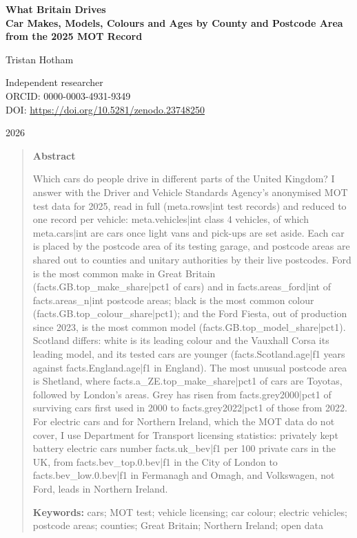 \documentclass[11pt,a4paper]{article}
\begin{document}
\begin{center}
{\Large\bfseries What Britain Drives\\[2pt] Car Makes, Models, Colours and Ages by County and Postcode Area\\[2pt] from the 2025 MOT Record\par}
\vspace{1.2em}
{\large Tristan Hotham\par}
\vspace{0.3em}
{\small Independent researcher\\
ORCID: 0000-0003-4931-9349\\
DOI: \href{https://doi.org/10.5281/zenodo.23748250}{https://doi.org/10.5281/zenodo.23748250}\par}
\vspace{0.8em}
2026
\end{center}

\begin{quote}
\small
\begin{center}\textbf{Abstract}\end{center}
Which cars do people drive in different parts of the United Kingdom? I answer with the Driver and Vehicle Standards Agency's anonymised MOT test data for 2025, read in full ({{meta.rows|int}} test records) and reduced to one record per vehicle: {{meta.vehicles|int}} class 4 vehicles, of which {{meta.cars|int}} are cars once light vans and pick-ups are set aside. Each car is placed by the postcode area of its testing garage, and postcode areas are shared out to counties and unitary authorities by their live postcodes. Ford is the most common make in Great Britain ({{facts.GB.top_make_share|pct1}} of cars) and in {{facts.areas_ford|int}} of {{facts.areas_n|int}} postcode areas; black is the most common colour ({{facts.GB.top_colour_share|pct1}}); and the Ford Fiesta, out of production since 2023, is the most common model ({{facts.GB.top_model_share|pct1}}). Scotland differs: white is its leading colour and the Vauxhall Corsa its leading model, and its tested cars are younger ({{facts.Scotland.age|f1}} years against {{facts.England.age|f1}} in England). The most unusual postcode area is Shetland, where {{facts.a_ZE.top_make_share|pct1}} of cars are Toyotas, followed by London's areas. Grey has risen from {{facts.grey2000|pct1}} of surviving cars first used in 2000 to {{facts.grey2022|pct1}} of those from 2022. For electric cars and for Northern Ireland, which the MOT data do not cover, I use Department for Transport licensing statistics: privately kept battery electric cars number {{facts.uk_bev|f1}} per 100 private cars in the UK, from {{facts.bev_top.0.bev|f1}} in the City of London to {{facts.bev_low.0.bev|f1}} in Fermanagh and Omagh, and Volkswagen, not Ford, leads in Northern Ireland.

\textbf{Keywords:} cars; MOT test; vehicle licensing; car colour; electric vehicles; postcode areas; counties; Great Britain; Northern Ireland; open data
\end{quote}
\end{document}
